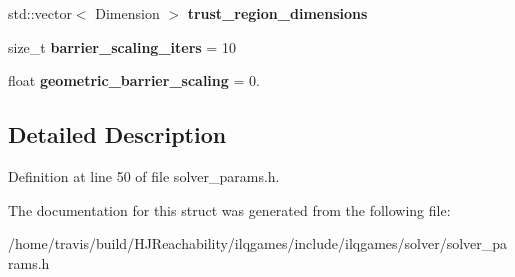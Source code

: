 \begin{DoxyCompactItemize}
\item 
std\+::vector$<$ Dimension $>$ {\bfseries trust\+\_\+region\+\_\+dimensions}\hypertarget{structilqgames_1_1_solver_params_a5d2025c32b094329c126777e53122a08}{}\label{structilqgames_1_1_solver_params_a5d2025c32b094329c126777e53122a08}

\item 
size\+\_\+t {\bfseries barrier\+\_\+scaling\+\_\+iters} = 10\hypertarget{structilqgames_1_1_solver_params_a0759cbca5370ac06afb2ed3b460ee233}{}\label{structilqgames_1_1_solver_params_a0759cbca5370ac06afb2ed3b460ee233}

\item 
float {\bfseries geometric\+\_\+barrier\+\_\+scaling} = 0.\hypertarget{structilqgames_1_1_solver_params_afe514e86e3439b0b041ce0fda74338bd}{}\label{structilqgames_1_1_solver_params_afe514e86e3439b0b041ce0fda74338bd}

\end{DoxyCompactItemize}


\subsection{Detailed Description}


Definition at line 50 of file solver\+\_\+params.\+h.



The documentation for this struct was generated from the following file\+:\begin{DoxyCompactItemize}
\item 
/home/travis/build/\+H\+J\+Reachability/ilqgames/include/ilqgames/solver/solver\+\_\+params.\+h\end{DoxyCompactItemize}
